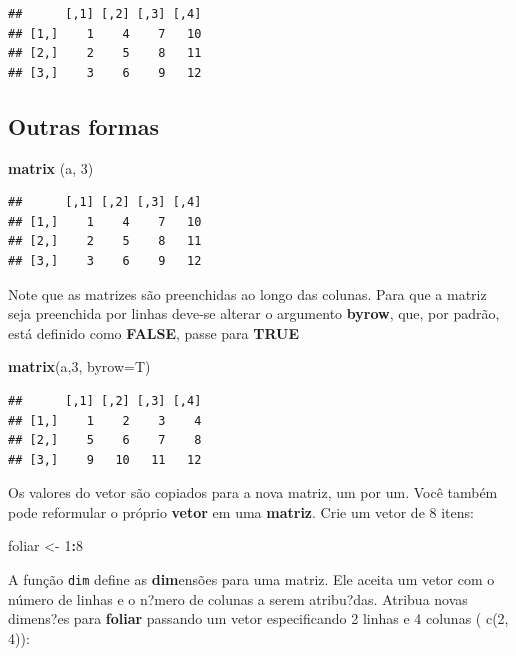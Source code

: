\documentclass[
]{book}
\newenvironment{Shaded}{\begin{snugshade}}{\end{snugshade}}
\newcommand{\DataTypeTok}[1]{\textcolor[rgb]{0.13,0.29,0.53}{#1}}
\newcommand{\DecValTok}[1]{\textcolor[rgb]{0.00,0.00,0.81}{#1}}
\newcommand{\KeywordTok}[1]{\textcolor[rgb]{0.13,0.29,0.53}{\textbf{#1}}}
\newcommand{\NormalTok}[1]{#1}
\newcommand{\OperatorTok}[1]{\textcolor[rgb]{0.81,0.36,0.00}{\textbf{#1}}}
\newcommand{\StringTok}[1]{\textcolor[rgb]{0.31,0.60,0.02}{#1}}
\begin{document}
\begin{verbatim}
##      [,1] [,2] [,3] [,4]
## [1,]    1    4    7   10
## [2,]    2    5    8   11
## [3,]    3    6    9   12
\end{verbatim}

\hypertarget{outras-formas}{%
\subsection{Outras formas}\label{outras-formas}}

\begin{Shaded}
\begin{Highlighting}[]
\KeywordTok{matrix}\NormalTok{ (a, }\DecValTok{3}\NormalTok{)}
\end{Highlighting}
\end{Shaded}

\begin{verbatim}
##      [,1] [,2] [,3] [,4]
## [1,]    1    4    7   10
## [2,]    2    5    8   11
## [3,]    3    6    9   12
\end{verbatim}

Note que as matrizes são preenchidas ao longo das colunas. Para que a matriz seja preenchida por linhas deve-se alterar o argumento \textbf{byrow}, que, por padrão, está definido como \textbf{FALSE}, passe para \textbf{TRUE}

\begin{Shaded}
\begin{Highlighting}[]
\KeywordTok{matrix}\NormalTok{(a,}\DecValTok{3}\NormalTok{, }\DataTypeTok{byrow=}\NormalTok{T)}
\end{Highlighting}
\end{Shaded}

\begin{verbatim}
##      [,1] [,2] [,3] [,4]
## [1,]    1    2    3    4
## [2,]    5    6    7    8
## [3,]    9   10   11   12
\end{verbatim}

Os valores do vetor são copiados para a nova matriz, um por um. Você também pode reformular o próprio \textbf{vetor} em uma \textbf{matriz}. Crie um vetor de 8 itens:

\begin{Shaded}
\begin{Highlighting}[]
\NormalTok{foliar <-}\StringTok{ }\DecValTok{1}\OperatorTok{:}\DecValTok{8}
\end{Highlighting}
\end{Shaded}

A função \texttt{dim} define as \textbf{dim}ensões para uma matriz. Ele aceita um vetor com o número de linhas e o n?mero de colunas a serem atribu?das.
Atribua novas dimens?es para \textbf{foliar} passando um vetor especificando 2 linhas e 4 colunas ( c(2, 4)):
\end{document}
